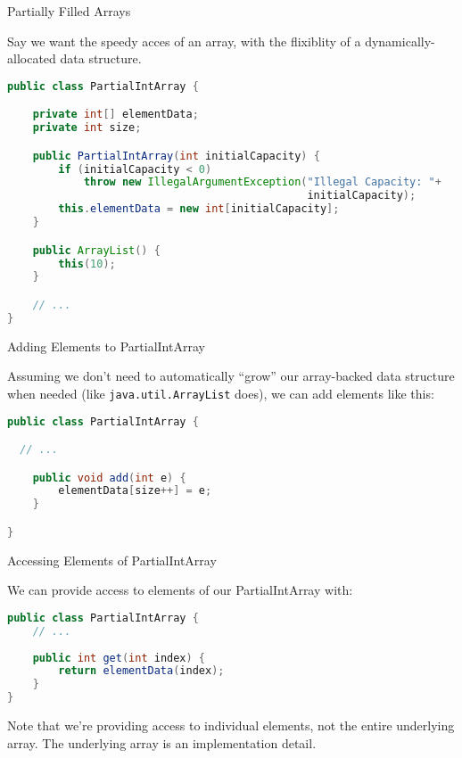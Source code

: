 \documentclass{beamer}
\begin{document}
\begin{frame}[fragile]{Partially Filled Arrays}


Say we want the speedy acces of an array, with the flixiblity of a dynamically-allocated data structure.

\begin{lstlisting}[language=Java]
public class PartialIntArray {

    private int[] elementData;
    private int size;

    public PartialIntArray(int initialCapacity) {
        if (initialCapacity < 0)
            throw new IllegalArgumentException("Illegal Capacity: "+
                                               initialCapacity);
        this.elementData = new int[initialCapacity];
    }

    public ArrayList() {
        this(10);
    }

    // ...
}
\end{lstlisting}

\end{frame}

\begin{frame}[fragile]{Adding Elements to PartialIntArray}


Assuming we don't need to automatically ``grow'' our array-backed data structure when needed (like {\tt java.util.ArrayList} does), we can add elements like this:

\begin{lstlisting}[language=Java]
public class PartialIntArray {

  // ...

    public void add(int e) {
        elementData[size++] = e;
    }

}
\end{lstlisting}

\end{frame}

\begin{frame}[fragile]{Accessing Elements of PartialIntArray}


We can provide access to elements of our PartialIntArray with:

\begin{lstlisting}[language=Java]
public class PartialIntArray {
    // ...
    
    public int get(int index) {
        return elementData(index);
    }
}
\end{lstlisting}

Note that we're providing access to individual elements, not the entire underlying array.  The underlying array is an implementation detail.
\end{frame}
\end{document}
